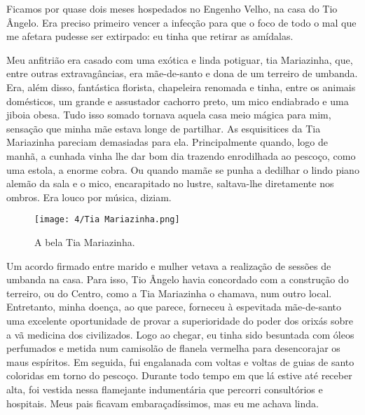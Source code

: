 Ficamos por quase dois meses hospedados no Engenho Velho, na casa do Tio Ângelo. 
Era preciso primeiro vencer a infecção para que o foco de todo o mal que me afetara pudesse ser extirpado: eu tinha que retirar as amídalas. 

Meu anfitrião era casado com uma exótica e linda potiguar, tia Mariazinha, que, entre outras extravagâncias, era mãe-de-santo e dona de um terreiro de umbanda. 
Era, além disso, fantástica florista, chapeleira renomada e tinha, entre os animais domésticos, um grande e assustador cachorro preto, um mico endiabrado e uma jiboia obesa. 
Tudo isso somado tornava aquela casa meio mágica para mim, sensação que minha mãe estava longe de partilhar. 
As esquisitices da Tia Mariazinha pareciam demasiadas para ela. 
Principalmente quando, logo de manhã, a cunhada vinha lhe dar bom dia trazendo enrodilhada ao pescoço, como uma estola, a enorme cobra. Ou quando mamãe se punha a dedilhar o lindo piano alemão da sala e o mico, encarapitado no lustre, saltava-lhe diretamente nos ombros. 
Era louco por música, diziam.

\begin{figure}[H]
\centering
\texttt{[image: 4/Tia Mariazinha.png]}
\caption{A bela Tia Mariazinha.}
\end{figure}

Um acordo firmado entre marido e mulher vetava a realização de sessões de umbanda na casa. 
Para isso, Tio Ângelo havia concordado com a construção do terreiro, ou do Centro, como a Tia Mariazinha o chamava, num outro local. 
Entretanto, minha doença, ao que parece, forneceu à espevitada mãe-de-santo uma excelente oportunidade de provar a superioridade do poder dos orixás sobre a vã medicina dos civilizados. 
Logo ao chegar, eu tinha sido besuntada com óleos perfumados e metida num camisolão de flanela vermelha para desencorajar os maus espíritos. 
Em seguida, fui engalanada com voltas e voltas de guias de santo coloridas em torno do pescoço. 
Durante todo tempo em que lá estive até receber alta, foi vestida nessa flamejante indumentária que percorri consultórios e hospitais. 
Meus pais ficavam embaraçadíssimos, mas eu me achava linda. 

